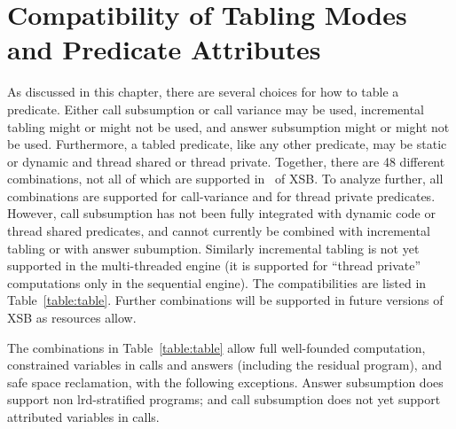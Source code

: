 \section{Compatibility of Tabling Modes and Predicate Attributes} \label{sec:tabling-compatibility}
%
As discussed in this chapter, there are several choices for how to
table a predicate. Either call subsumption or call variance may be
used, incremental tabling might or might not be used, and answer
subsumption might or might not be used.  Furthermore, a tabled
predicate, like any other predicate, may be static or dynamic and
thread shared or thread private.  Together, there are 48 different
combinations, not all of which are supported in \version\ of XSB.  To
analyze further, all combinations are supported for call-variance and
for thread private predicates.  However, call subsumption has not been
fully integrated with dynamic code or thread shared predicates, and
cannot currently be combined with incremental tabling or with answer
subumption.  Similarly incremental tabling is not yet supported in the
multi-threaded engine (it is supported for ``thread private''
computations only in the sequential engine).  The compatibilities are
listed in Table~\ref{table:table}.  Further combinations will be
supported in future versions of XSB as resources allow.

The combinations in Table~\ref{table:table} allow full well-founded
computation, constrained variables in calls and answers (including the
residual program), and safe space reclamation, with the following
exceptions.  Answer subsumption does support non lrd-stratified
programs; and call subsumption does not yet support attributed
variables in calls.  

